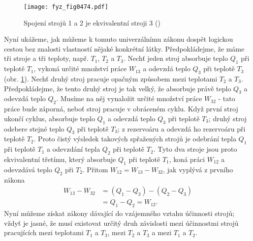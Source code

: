     \begin{figure}[ht!] %
      \centering
      \texttt{[image: fyz\_fig0474.pdf]}
      \caption{Spojení strojů 1 a 2 je ekvivalentní stroji 3 (\cite[s.~707]{Feynman01})}
      \label{fyz:fig0474}
    \end{figure}

    Nyní ukážeme, jak můžeme k tomuto univerzálnímu zákonu dospět logickou cestou bez znalosti
    vlastností nějaké konkrétní látky. Předpokládejme, že máme tři stroje a tři teploty, např.
    \(T_1\), \(T_2\) a \(T_3\). Nechť jeden stroj absorbuje teplo \(Q_1\) při teplotě \(T_1\),
    vykoná určité množství práce \(W_{13}\) a odevzdá teplo \(Q_3\) při teplotě \(T_3\) (obr.
    \ref{fyz:fig0474}). Nechť druhý stroj pracuje opačným způsobem mezi teplotami \(T_2\) a \(T_3\).
    Předpokládejme, že tento druhý stroj je tak velký, že absorbuje právě teplo \(Q_3\) a odevzdá
    teplo \(Q_2\). Musíme na něj vynaložit určité množství práce \(W_{32}\) - tato práce bude
    záporná, neboť stroj pracuje v obráceném cyklu. Když první stroj ukončí cyklus, absorbuje teplo
    \(Q_1\) a odevzdá teplo \(Q_3\) při teplotě \(T_3\); druhý stroj odebere stejné teplo \(Q_3\)
    při teplotě \(T_3\); z rezervoáru a odevzdá ho rezervoáru při teplotě \(T_2\). Proto čistý
    výsledek takových spřažených strojů je odebrání tepla \(Q_1\) při teplotě \(T_1\) a odevzdání
    tepla \(Q_2\) při teplotě \(T_2\). Tyto dva stroje jsou proto ekvivalentní třetímu, který
    absorbuje \(Q_1\) při teplotě \(T_1\), koná práci \(W_{12}\) a odevzdává teplo \(Q_2\) při
    \(T_2\). Přitom \(W_{12} = W_{13} - W_{32}\), jak vyplývá z prvního zákona
    \begin{align}
      W_{13}−W_{32}&=(Q_1-Q_3)-(Q_2-Q_3) \nonumber \\
                   &=Q_1-Q_2=W_{12}.     \label{fyz:eq678}
    \end{align}
    Nyní můžeme získat zákony dávající do vzájemného vztahu účinnosti strojů; vždyť je jasné, že
    musí existovat určitý druh závislosti mezi účinnostmi strojů pracujících mezi teplotami \(T_1\)
    a \(T_3\), mezi \(T_2\) a \(T_3\) a mezi \(T_1\) a \(T_2\).


